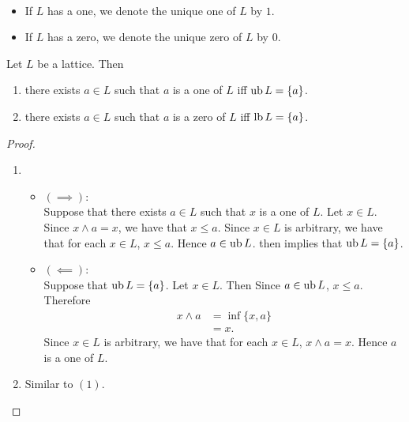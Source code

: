 \documentclass{book}
\begin{document}
	\begin{note}\
		\begin{itemize}
			\item If $L$ has a one, we denote the unique one of $L$ by $1$.
			\item If $L$ has a zero, we denote the unique zero of $L$ by $0$.
		\end{itemize}
	\end{note}
	
	\begin{ex}
		Let $L$ be a lattice. Then 
		\begin{enumerate}
			\item there exists $a \in L$ such that $a$ is a one of $L$ iff $\operatorname{ub} L = \{a\}$.
			\item there exists $a \in L$ such that $a$ is a zero of $L$ iff $\operatorname{lb} L = \{a\}$.
		\end{enumerate} 
	\end{ex}
	
	\begin{proof}\
		\begin{enumerate}
			\item 
			\begin{itemize}
				\item $(\implies)$: \\
				Suppose that there exists $a \in L$ such that $x$ is a one of $L$. Let $x \in L$. Since $x \wedge a = x$, we have that $x \leq a$. Since $x \in L$ is arbitrary, we have that for each $x \in L$, $x \leq a$. Hence $a \in \operatorname{ub} L$.  then implies that $\operatorname{ub} L = \{a\}$.
				\item $(\impliedby)$: \\
				Suppose that $\operatorname{ub} L = \{a\}$. Let $x \in L$. Then Since $a \in \operatorname{ub} L$, $x \leq a$. Therefore
				\begin{align*}
					x \wedge a
					& = \inf \{x, a\} \\
					& = x.
				\end{align*}
				Since $x \in L$ is arbitrary, we have that for each $x \in L$, $x \wedge a = x$. Hence $a$ is a one of $L$.
			\end{itemize}
			\item Similar to $(1)$.
		\end{enumerate}
	\end{proof}
	
	
	
	
	
	
	
	
	
\end{document}
